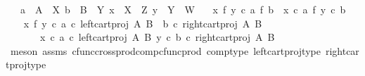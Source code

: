 \begin{isabellebody}
\ \ \ {\isachardoublequoteopen}a\ {\isacharcolon}{\kern0pt}\ A\ {\isasymrightarrow}\ X{\isachardoublequoteclose}\ {\isachardoublequoteopen}b\ {\isacharcolon}{\kern0pt}\ B\ {\isasymrightarrow}\ Y{\isachardoublequoteclose}\ {\isachardoublequoteopen}x\ {\isacharcolon}{\kern0pt}\ X\ {\isasymrightarrow}\ Z{\isachardoublequoteclose}\ {\isachardoublequoteopen}y\ {\isacharcolon}{\kern0pt}\ Y\ {\isasymrightarrow}\ W{\isachardoublequoteclose}\isanewline
\ \ \ {\isachardoublequoteopen}{\isacharparenleft}{\kern0pt}x\ {\isasymtimes}\isactrlsub f\ y{\isacharparenright}{\kern0pt}\ {\isasymcirc}\isactrlsub c\ {\isacharparenleft}{\kern0pt}a\ {\isasymtimes}\isactrlsub f\ b{\isacharparenright}{\kern0pt}\ {\isacharequal}{\kern0pt}\ {\isacharparenleft}{\kern0pt}x\ {\isasymcirc}\isactrlsub c\ a{\isacharparenright}{\kern0pt}\ {\isasymtimes}\isactrlsub f\ {\isacharparenleft}{\kern0pt}y\ {\isasymcirc}\isactrlsub c\ b{\isacharparenright}{\kern0pt}{\isachardoublequoteclose}\isanewline
%
\isadelimproof
%
\endisadelimproof
%
\isatagproof
{}\isamarkupfalse%
\ {\isacharminus}{\kern0pt}\isanewline
\ \ \isamarkupfalse%
\ {\isachardoublequoteopen}{\isacharparenleft}{\kern0pt}x\ {\isasymtimes}\isactrlsub f\ y{\isacharparenright}{\kern0pt}\ {\isasymcirc}\isactrlsub c\ {\isasymlangle}a\ {\isasymcirc}\isactrlsub c\ left{\isacharunderscore}{\kern0pt}cart{\isacharunderscore}{\kern0pt}proj\ A\ B\ {\isacharcomma}{\kern0pt}\ b\ {\isasymcirc}\isactrlsub c\ right{\isacharunderscore}{\kern0pt}cart{\isacharunderscore}{\kern0pt}proj\ A\ B{\isasymrangle}\isanewline
\ \ \ \ \ \ {\isacharequal}{\kern0pt}\ {\isasymlangle}x\ {\isasymcirc}\isactrlsub c\ a\ {\isasymcirc}\isactrlsub c\ left{\isacharunderscore}{\kern0pt}cart{\isacharunderscore}{\kern0pt}proj\ A\ B{\isacharcomma}{\kern0pt}\ y\ {\isasymcirc}\isactrlsub c\ b\ {\isasymcirc}\isactrlsub c\ right{\isacharunderscore}{\kern0pt}cart{\isacharunderscore}{\kern0pt}proj\ A\ B{\isasymrangle}{\isachardoublequoteclose}\isanewline
\ \ \ \ \isamarkupfalse%
\ {\isacharparenleft}{\kern0pt}meson\ assms\ cfunc{\isacharunderscore}{\kern0pt}cross{\isacharunderscore}{\kern0pt}prod{\isacharunderscore}{\kern0pt}comp{\isacharunderscore}{\kern0pt}cfunc{\isacharunderscore}{\kern0pt}prod\ comp{\isacharunderscore}{\kern0pt}type\ left{\isacharunderscore}{\kern0pt}cart{\isacharunderscore}{\kern0pt}proj{\isacharunderscore}{\kern0pt}type\ right{\isacharunderscore}{\kern0pt}cart{\isacharunderscore}{\kern0pt}proj{\isacharunderscore}{\kern0pt}type{\isacharparenright}{\kern0pt}\isanewline
\ \ \isamarkupfalse%

\end{isabellebody}
